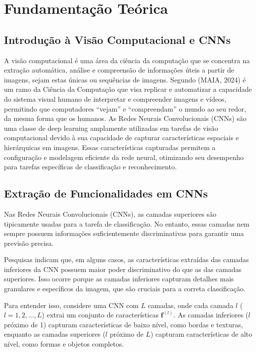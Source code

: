 \documentclass{article}
\begin{document}
\section{Fundamentação Teórica}

\subsection{Introdução à Visão Computacional e CNNs}

A visão computacional é uma área da ciência da computação que se concentra na extração automática, análise e compreensão de informações úteis a partir de imagens, sejam estas únicas ou sequências de imagens. Segundo (MAIA, 2024) é um ramo da Ciência da Computação que visa replicar e automatizar a capacidade do sistema visual humano de interpretar e compreender imagens e vídeos, permitindo que computadores “vejam” e “compreendam” o mundo ao seu redor, da mesma forma que os humanos. As Redes Neurais Convolucionais (CNNs) são uma classe de deep learning amplamente utilizadas em tarefas de visão computacional devido à sua capacidade de capturar características espaciais e hierárquicas em imagens. Essas características capturadas permitem a configuração e modelagem eficiente da rede neural, otimizando seu desempenho para tarefas específicas de classificação e reconhecimento.

\subsection{Extração de Funcionalidades em CNNs}

Nas Redes Neurais Convolucionais (CNNs), as camadas superiores são tipicamente usadas para a tarefa de classificação. No entanto, essas camadas nem sempre possuem informações suficientemente discriminativas para garantir uma previsão precisa. 

Pesquisas indicam que, em alguns casos, as características extraídas das camadas inferiores da CNN possuem maior poder discriminativo do que as das camadas superiores. Isso ocorre porque as camadas inferiores capturam detalhes mais granulares e específicos da imagem, que são cruciais para a correta classificação.

Para entender isso, considere uma CNN com \( L \) camadas, onde cada camada \( l \) (\( l = 1, 2, \ldots, L \)) extrai um conjunto de características \( \mathbf{f}^{(l)} \). As camadas inferiores (\( l \) próximo de 1) capturam características de baixo nível, como bordas e texturas, enquanto as camadas superiores (\( l \) próximo de \( L \)) capturam características de alto nível, como formas e objetos completos.
\end{document}
